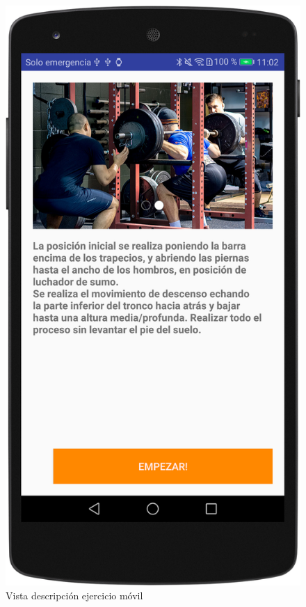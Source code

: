 \begin{figure}[H]
	\centering
	\includegraphics[scale=0.10]{imagenes/m5.png}
	\caption{Vista descripción ejercicio móvil}
	\label{Vista descripción ejercicio movil}
\end{figure}

